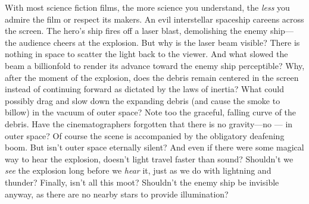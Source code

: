 With most science fiction films, the more science you 
understand, the {\em less} you admire the film or respect 
its makers. An evil interstellar spaceship careens across 
the screen. The hero's ship fires off a laser blast, 
demolishing the enemy ship---the audience cheers at the 
explosion. But why is the laser beam visible? There is 
nothing in space to scatter the light back to the viewer. 
And what slowed the beam a billionfold to render its advance
toward the enemy ship perceptible? Why, after the moment of 
the explosion, does the debris remain centered in the screen
instead of continuing forward as dictated by the laws of 
inertia? What could possibly drag and slow down the 
expanding debris (and cause the smoke to billow) in the 
vacuum of outer space? Note too the graceful, falling curve 
of the debris. Have the cinematographers forgotten that 
there is no gravity---no --- in outer 
space? Of course the scene is accompanied by the obligatory 
deafening boom. But isn't outer space eternally silent? And 
even if there were some magical way to hear the explosion, 
doesn't light travel faster than sound? Shouldn't we {\em 
see} the explosion long before we {\em hear} it, just as we 
do with lightning and thunder? Finally, isn't all this moot?
Shouldn't the enemy ship be invisible anyway, as there are 
no nearby stars to provide illumination?  
